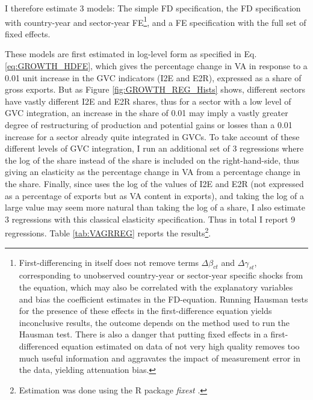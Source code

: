 \documentclass[a4paper]{article}
\begin{document}
I therefore estimate 3 models: The simple FD specification, the FD specification with country-year and sector-year FE\footnote{First-differencing in itself does not remove terms $\Delta\beta_{ct}$ and $\Delta\gamma_{st}$, corresponding to unobserved country-year or sector-year specific shocks from the equation, which may also be correlated with the explanatory variables and bias the coefficient estimates in the FD-equation. Running Hausman tests for the presence of these effects in the first-difference equation yields inconclusive results, the outcome depends on the method used to run the Hausman test. There is also a danger that putting fixed effects in a first-differenced equation estimated on data of not very high quality removes too much useful information and aggravates the impact of measurement error in the data, yielding attenuation bias.}, and a FE specification with the full set of fixed effects. \newline 

These models are first estimated in log-level form as specified in Eq. \ref{eq:GROWTH_HDFE}, which gives the percentage change in VA in response to a 0.01 unit increase in the GVC indicators (I2E and E2R), expressed as a share of gross exports. But as Figure \ref{fig:GROWTH_REG_Hists} shows, different sectors have vastly different I2E and E2R shares, thus for a sector with a low level of GVC integration, an increase in the share of 0.01 may imply a vastly greater degree of restructuring of production and potential gains or losses than a 0.01 increase for a sector already quite integrated in GVCs. To take account of these different levels of GVC integration, I run an additional set of 3 regressions where the log of the share instead of the share is included on the right-hand-side, thus giving an elasticity as the percentage change in VA from a percentage change in the share. Finally, since \citet{Kummritz20161} uses the log of the values of I2E and E2R (not expressed as a percentage of exports but as VA content in exports), and taking the log of a large value may seem more natural than taking the log of a share, I also estimate 3 regressions with this classical elasticity specification. Thus in total I report 9 regressions. %
Table \ref{tab:VAGRREG} reports the results\footnote{Estimation was done using the R package \textit{fixest} \citep{fixest2018}.}. \newline %
\end{document}
